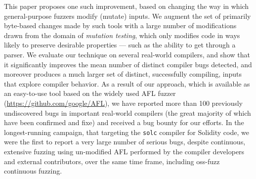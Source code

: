   This paper proposes one such improvement, based on changing the way
  in which general-purpose fuzzers modify (mutate) inputs.  We augment
  the set of primarily byte-based changes made by such tools with a large number of
  modifications drawn from the domain of \emph{mutation testing},
  which only modifies code in ways likely to preserve desirable
  properties --- such as the ability to get through a parser.  We evaluate
  our technique on several real-world compilers, and show that it
  significantly improves the mean number of distinct compiler bugs
  detected, and moreover produces a much larger set of distinct,
  successfully compiling, inputs that explore compiler behavior.  As a
  result of our approach, which is available as an easy-to-use tool
  based on the widely used AFL fuzzer
  (\url{https://github.com/google/AFL}), we have reported more than
  100 previously undiscovered 
  bugs in important real-world compilers (the great majority of
  which have been confirmed and fixe) and received a bug bounty for
  our efforts.  In the longest-running campaign, that targeting the
  {\tt solc} compiler for Solidity code, we were the first to
  report a very large number of serious bugs, despite continuous, extensive
  fuzzing using un-modified AFL performed by the compiler developers
  and external contributors, over the same time frame, including
  oss-fuzz continuous fuzzing.
